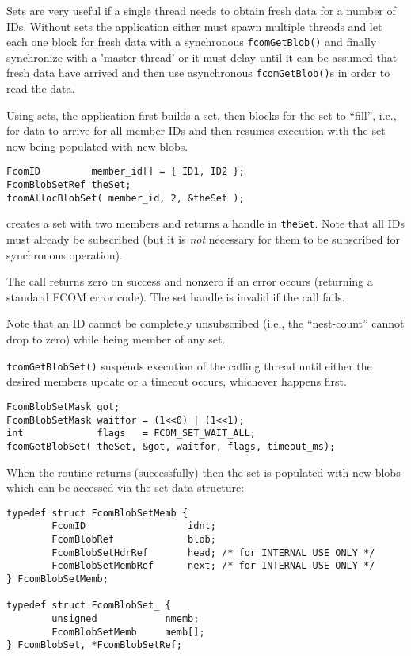 \documentclass[11pt]{article}
\newcommand{\fcom}{FCOM}
\newcommand{\blob}{blob}
\newcommand{\set}{set}
\newcommand{\Set}{Set}
\newcommand{\cstl}[1]{{\lstinline+#1+}}
\begin{document}
      \Set{}s are very useful if a single thread needs to obtain fresh
      data for a number of IDs. Without \set{}s the application either must
      spawn multiple threads and let each one block for fresh data
      with a synchronous \cstl{fcomGetBlob()} and finally synchronize
      with a 'master-thread' or it must delay until it can be assumed
      that fresh data have arrived and then use asynchronous \cstl{fcomGetBlob()}s
      in order to read the data.

      Using \set{}s, the application first builds a \set, then blocks
      for the \set{} to ``fill'', i.e., for data to arrive for all member IDs
      and then resumes execution with the \set{} now being populated with
      new \blob{}s.

      \begin{verbatim}
FcomID         member_id[] = { ID1, ID2 };
FcomBlobSetRef theSet;
fcomAllocBlobSet( member_id, 2, &theSet );
      \end{verbatim}
      creates a \set{} with two members and returns a handle in \cstl{theSet}.
      Note that all IDs must already be subscribed (but it is {\em not} necessary for
      them to be subscribed for synchronous operation).

      The call returns zero on success and nonzero if an error occurs (returning
      a standard \fcom{} error code). The \set{} handle is invalid if the call
      fails.

      Note that an ID cannot be completely unsubscribed (i.e., the ``nest-count''
      cannot drop to zero) while being member of any \set.

      \cstl{fcomGetBlobSet()} suspends execution of the calling thread until
      either the desired members update or a timeout occurs, whichever happens
      first.

      \begin{verbatim}
FcomBlobSetMask got;
FcomBlobSetMask waitfor = (1<<0) | (1<<1);
int             flags   = FCOM_SET_WAIT_ALL;
fcomGetBlobSet( theSet, &got, waitfor, flags, timeout_ms);
      \end{verbatim}

      When the routine returns (successfully) then the \set{} is populated with new \blob{}s
      which can be accessed via the \set{} data structure:

      \begin{verbatim}
typedef struct FcomBlobSetMemb {
        FcomID                  idnt;
        FcomBlobRef             blob;
        FcomBlobSetHdrRef       head; /* for INTERNAL USE ONLY */
        FcomBlobSetMembRef      next; /* for INTERNAL USE ONLY */
} FcomBlobSetMemb;
 
typedef struct FcomBlobSet_ {
        unsigned            nmemb;
        FcomBlobSetMemb     memb[];
} FcomBlobSet, *FcomBlobSetRef;
      \end{verbatim}
\end{document}
